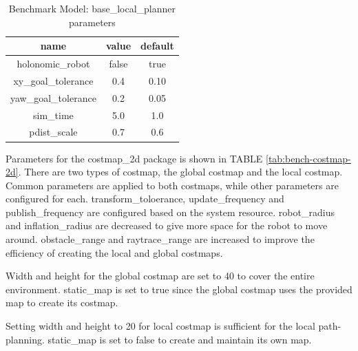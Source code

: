 \documentclass[10pt,journal,compsoc]{IEEEtran}
\begin{document}
\begin{table}[h]
\caption{Benchmark Model: base\_local\_planner parameters}
\label{tab:bench-base-local-planner}
\begin{center}
\begin{tabular}{|c|c|c|}
\hline
name & value & default \\
\hline
\hline
holonomic\_robot & false & true \\
\hline
xy\_goal\_tolerance & 0.4 & 0.10 \\
\hline
yaw\_goal\_tolerance & 0.2 & 0.05 \\
\hline
sim\_time & 5.0 & 1.0\\
\hline
pdist\_scale & 0.7 & 0.6\\
\hline
\end{tabular}
\end{center}
\end{table}

Parameters for the costmap\_2d package is shown in TABLE \ref{tab:bench-costmap-2d}. There are two types of costmap, the global costmap and the local costmap. Common parameters are applied to both costmaps, while other parameters are configured for each. transform\_toloerance, update\_frequency and publish\_frequency are configured based on the system resource. robot\_radius and inflation\_radius are decreased to give more space for the robot to move around. obstacle\_range and raytrace\_range are increased to improve the efficiency of creating the local and global costmaps.

Width and height for the global costmap are set to 40 to cover the entire environment. static\_map is set to true since the global costmap uses the provided map to create its costmap.

Setting width and height to 20 for local costmap is sufficient for the local path-planning. static\_map is set to false to create and maintain its own map.
\end{document}
